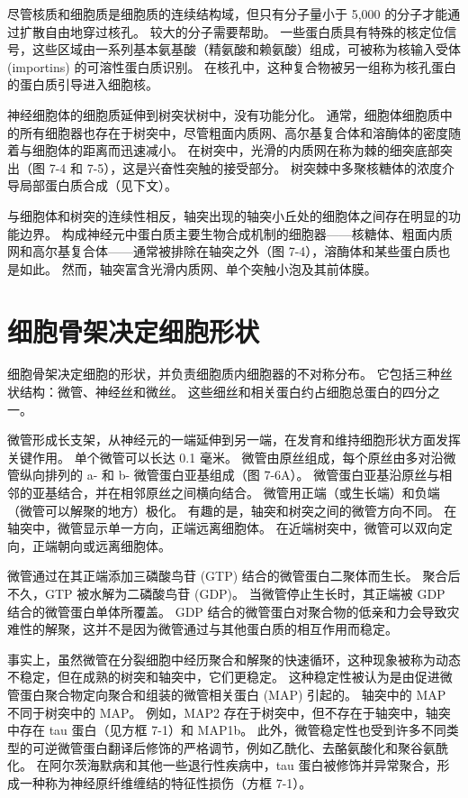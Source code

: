 尽管核质和细胞质是细胞质的连续结构域，但只有分子量小于 5,000 的分子才能通过扩散自由地穿过核孔。 
较大的分子需要帮助。 
一些蛋白质具有特殊的核定位信号，这些区域由一系列基本氨基酸（精氨酸和赖氨酸）组成，可被称为核输入受体 (importins) 的可溶性蛋白质识别。 
在核孔中，这种复合物被另一组称为核孔蛋白的蛋白质引导进入细胞核。


神经细胞体的细胞质延伸到树突状树中，没有功能分化。 
通常，细胞体细胞质中的所有细胞器也存在于树突中，尽管粗面内质网、高尔基复合体和溶酶体的密度随着与细胞体的距离而迅速减小。 
在树突中，光滑的内质网在称为棘的细突底部突出（图 7-4 和 7-5），这是兴奋性突触的接受部分。 树突棘中多聚核糖体的浓度介导局部蛋白质合成（见下文）。


与细胞体和树突的连续性相反，轴突出现的轴突小丘处的细胞体之间存在明显的功能边界。 
构成神经元中蛋白质主要生物合成机制的细胞器——核糖体、粗面内质网和高尔基复合体——通常被排除在轴突之外（图 7-4），溶酶体和某些蛋白质也是如此。 
然而，轴突富含光滑内质网、单个突触小泡及其前体膜。


\section{细胞骨架决定细胞形状}
细胞骨架决定细胞的形状，并负责细胞质内细胞器的不对称分布。 
它包括三种丝状结构：微管、神经丝和微丝。 
这些细丝和相关蛋白约占细胞总蛋白的四分之一。


微管形成长支架，从神经元的一端延伸到另一端，在发育和维持细胞形状方面发挥关键作用。 
单个微管可以长达 0.1 毫米。 
微管由原丝组成，每个原丝由多对沿微管纵向排列的 a- 和 b- 微管蛋白亚基组成（图 7-6A）。 
微管蛋白亚基沿原丝与相邻的亚基结合，并在相邻原丝之间横向结合。 
微管用正端（或生长端）和负端（微管可以解聚的地方）极化。 
有趣的是，轴突和树突之间的微管方向不同。 
在轴突中，微管显示单一方向，正端远离细胞体。 
在近端树突中，微管可以双向定向，正端朝向或远离细胞体。


微管通过在其正端添加三磷酸鸟苷 (GTP) 结合的微管蛋白二聚体而生长。 
聚合后不久，GTP 被水解为二磷酸鸟苷 (GDP)。 
当微管停止生长时，其正端被 GDP 结合的微管蛋白单体所覆盖。 
GDP 结合的微管蛋白对聚合物的低亲和力会导致灾难性的解聚，这并不是因为微管通过与其他蛋白质的相互作用而稳定。


事实上，虽然微管在分裂细胞中经历聚合和解聚的快速循环，这种现象被称为动态不稳定，但在成熟的树突和轴突中，它们更稳定。 
这种稳定性被认为是由促进微管蛋白聚合物定向聚合和组装的微管相关蛋白 (MAP) 引起的。 
轴突中的 MAP 不同于树突中的 MAP。 
例如，MAP2 存在于树突中，但不存在于轴突中，轴突中存在 tau 蛋白（见方框 7-1）和 MAP1b。 
此外，微管稳定性也受到许多不同类型的可逆微管蛋白翻译后修饰的严格调节，例如乙酰化、去酪氨酸化和聚谷氨酰化。 
在阿尔茨海默病和其他一些退行性疾病中，tau 蛋白被修饰并异常聚合，形成一种称为神经原纤维缠结的特征性损伤（方框 7-1）。


